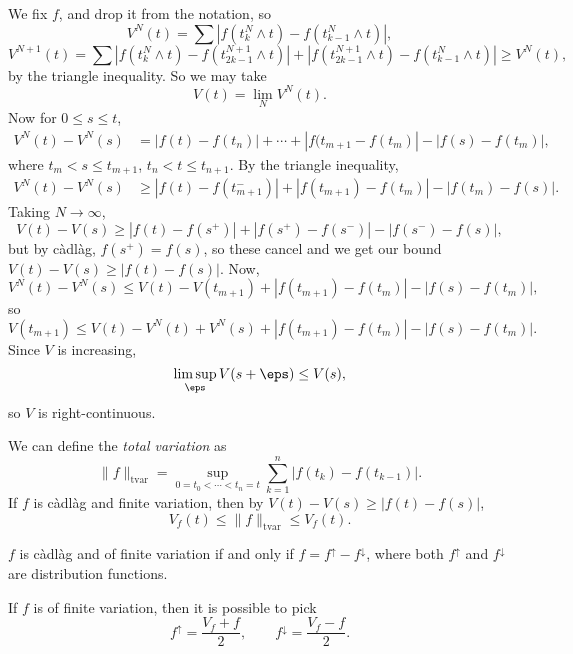 \documentclass[12pt]{article}
\begin{document}
\begin{proofbox}
	We fix $f$, and drop it from the notation, so
	\[
	V^{N}(t) = \sum \left| f(t_k^N \wedge t) - f(t_{k-1}^N \wedge t)\right|,
	\]
	\[
	V^{N+1}(t) = \sum \left| f(t_k^N \wedge t) - f(t_{2k-1}^{N+1} \wedge t)\right| + \left| f(t_{2k-1}^{N+1} \wedge t) - f(t_{k-1}^N \wedge t) \right| \geq V^{N}(t),
	\]
	by the triangle inequality. So we may take
	\[
	V(t) = \lim_{N} V^{N}(t).
	\]
	Now for $0 \leq s \leq t$,
	\begin{align*}
		V^{N}(t) - V^{N}(s) &= |f(t) - f(t_n)| + \cdots + |f(t_{m+1} - f(t_m)| - |f(s) - f(t_m)|,
	\end{align*}
	where $t_m < s \leq t_{m+1}$, $t_n < t \leq t_{n+1}$. By the triangle inequality,
	\begin{align*}
		V^{N}(t) - V^{N}(s) &\geq |f(t) - f(t_{m+1}^{-})| + |f(t_{m+1}) - f(t_m)| - |f(t_m) - f(s)|.
	\end{align*}
	Taking $N \to \infty$,
	\[
	V(t) - V(s) \geq |f(t) - f(s^+)| + |f(s^+) - f(s^-)| - |f(s^-) - f(s)|,
	\]
	but by c\`adl\`ag, $f(s^+) = f(s)$, so these cancel and we get our bound $V(t) - V(s) \geq |f(t) - f(s)|$. Now,
	\[
	V^N(t) - V^N(s) \leq V(t) - V(t_{m+1}) + |f(t_{m+1}) - f(t_m)| - |f(s) - f(t_m)|,
	\]
	so
	\[
	V(t_{m+1}) \leq V(t) - V^N(t) + V^N(s) + |f(t_{m+1}) - f(t_m)| - |f(s)-f(t_m)|.
	\]
	Since $V$ is increasing,
	\[
	\limsup_{\eps} V(s + \eps) \leq V(s),
	\]
	so $V$ is right-continuous.
\end{proofbox}

\begin{remark}
	We can define the \emph{total variation} as
	\[
	\|f\|_{\mathrm{tvar}} = \sup_{0 = t_0 < \cdots < t_n = t} \sum_{k = 1}^n |f(t_k) - f(t_{k-1})|.
	\]
	If $f$ is c\`adl\`ag and finite variation, then by $V(t) - V(s) \geq |f(t) - f(s)|$,
	\[
	V_f(t) \leq \|f\|_{\mathrm{tvar}} \leq V_f(t).
	\]
	
\end{remark}


\begin{proposition}
	$f$ is c\`adl\`ag and of finite variation if and only if $f = f^\uparrow- f^\downarrow$, where both $f^\uparrow$ and $f^\downarrow$ are distribution functions.

	If $f$ is of finite variation, then it is possible to pick
	\[
	f^\uparrow = \frac{V_f + f}{2}, \qquad f^\downarrow = \frac{V_f - f}{2}.
	\]
\end{proposition}
\end{document}
